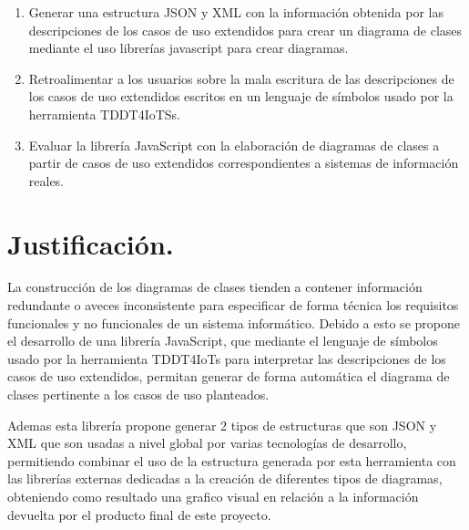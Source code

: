 \begin{enumerate}
	\item Generar una estructura JSON y XML con la información obtenida por las descripciones de los casos de uso extendidos para crear un diagrama de clases mediante el uso librerías javascript para crear diagramas.
	
	\item Retroalimentar a los usuarios sobre la mala escritura de las descripciones de los casos de uso extendidos escritos en un lenguaje de símbolos usado por la herramienta TDDT4IoTSs. 
	
	\item Evaluar la librería JavaScript con la elaboración de diagramas de clases a partir de casos de uso extendidos correspondientes a sistemas de información reales.
\end{enumerate}

\section{Justificación.}

La construcción de los diagramas de clases tienden a contener información redundante o aveces inconsistente para especificar de forma técnica los requisitos funcionales y no funcionales de un sistema informático. Debido a esto se propone el desarrollo de una librería JavaScript, que mediante el lenguaje de símbolos usado por la herramienta TDDT4IoTs para interpretar las descripciones de los casos de uso extendidos, permitan generar de forma automática el diagrama de clases pertinente a los casos de uso planteados. 

Ademas esta librería propone generar 2 tipos de estructuras que son JSON y XML que son usadas a nivel global por varias tecnologías de desarrollo, permitiendo combinar el uso de la estructura generada por esta herramienta con las librerías externas dedicadas a la creación de diferentes tipos de diagramas, obteniendo como resultado una grafico visual en relación a la información devuelta por el producto final de este proyecto. 